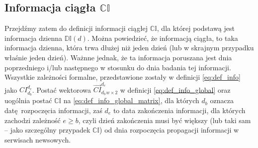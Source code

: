 \subsection{Informacja ciągła $\mathbb{CI}$}

Przejdźmy zatem do definicji  informacji ciągłej $\mathbb{CI}$, dla której podstawą jest 
informacja dzienna $\mathbb{DI}(d)$. Można powiedzieć, że informacją ciągła, to taka informacja 
dzienna, która trwa dłużej niż jeden dzień (lub w skrajnym przypadku właśnie jeden dzień). 
Ważnne jednak, że ta informacja poruszana jest dnia poprzedniego i/lub następnego w stosunku 
do dnia badania tej informacji. Wszystkie zależności formalne, przedstawione zostały 
w definicji \ref{eq:def_info} jako $CI_{d_{b}}^{d_{e}}$. Postać wektorowa 
$\vec{CI}_{d_{b}}^{d_{e}}_{w \times 2}$ w definicji \ref{eq:def_info_global} 
oraz uogólnia postać $\mathbb{CI}$ na \ref{eq:def_info_global_matrix}, dla których 
$d_{b}$ oznacza datę rozpoczęcia informacji, zaś $d_{e}$ to data zakończenia informacji,
dla których zachodzi zależność $e \geq b$, czyli dzień zakończenia musi być większy 
(lub taki sam -- jako szczególny przypadek $\mathbb{CI}$) od dnia rozpoczęcia propagacji
informacji w serwisach newsowych.

